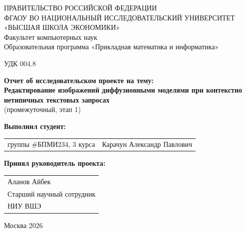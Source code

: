 \begin{titlepage}
\newpage

{
\begin{center}
ПРАВИТЕЛЬСТВО РОССИЙСКОЙ ФЕДЕРАЦИИ\\
ФГАОУ ВО НАЦИОНАЛЬНЫЙ ИССЛЕДОВАТЕЛЬСКИЙ УНИВЕРСИТЕТ\\
«ВЫСШАЯ ШКОЛА ЭКОНОМИКИ»
\\
\bigskip
Факультет компьютерных наук\\
Образовательная программа «Прикладная математика и информатика»
\end{center}
}

\vspace{2em}
УДК 004.8 %
\vspace{4em}

\begin{center}
{\bf Отчет об исследовательском проекте на тему:}\\
{\bf Редактирование изображений диффузионными
моделями при контекстно нетипичных текстовых
запросах}\\
(промежуточный, этап 1)
\end{center}

\vspace{2em}

{\bf Выполнил студент: \vspace{2mm}}

{
\begin{tabular}{l@{\hskip 1.5cm}l}
группы \#БПМИ234, 3 курса & Карачун Александр Павлович \\
\end{tabular}}


\vspace{1em}
{\bf Принял руководитель проекта: \vspace{2mm}}

{
\begin{tabular}{l}
Аланов Айбек\\

Старший научный сотрудник\\
НИУ ВШЭ
\end{tabular}}

\vspace{\fill}

\begin{center}
Москва 2026
\end{center}

\end{titlepage}